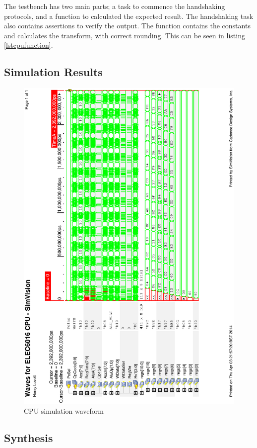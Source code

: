 The testbench has two main parts; a task to commence the handshaking protocols, and a function to calculated the expected result. 
The handshaking task also contains assertions to verify the output. 
The function contains the constants and calculates the transform, with correct rounding.
This can be seen in listing \ref{lstcpufunction}. 





\subsection{Simulation Results}
\begin{figure}
\includegraphics[height=\textheight]{Figures/cpusim.eps}
\caption{CPU simulation waveform}
\label{fig:cpusim}
\end{figure}

\subsection{Synthesis}


